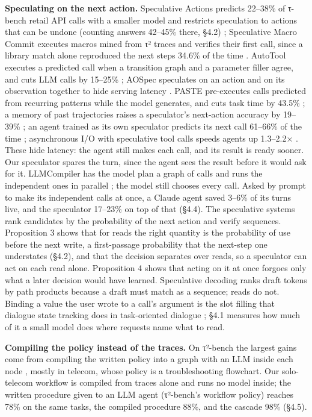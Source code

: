 \documentclass[10pt,twocolumn,letterpaper]{article}
\newcommand{\runin}[1]{{\sffamily\bfseries\color{accent}#1}}
\begin{document}
\runin{Speculating on the next action.} Speculative Actions predicts 22--38\% of τ-bench retail API calls with a smaller model and restricts speculation to actions that can be undone (counting answers 42--45\% there, §4.2) \citep{ye2026speculativeactions}; Speculative Macro Commit executes macros mined from τ² traces and verifies their first call, since a library match alone reproduced the next steps 34.6\% of the time \citep{liu2026macrocommit}. AutoTool executes a predicted call when a transition graph and a parameter filler agree, and cuts LLM calls by 15--25\% \citep{jia2026autotool}; AOSpec speculates on an action and on its observation together to hide serving latency \citep{chen2026aospec}. PASTE pre-executes calls predicted from recurring patterns while the model generates, and cuts task time by 43.5\% \citep{sui2026paste}; a memory of past trajectories raises a speculator's next-action accuracy by 19--39\% \citep{li2026specmemory}; an agent trained as its own speculator predicts its next call 61--66\% of the time \citep{ji2026specreason}; asynchronous I/O with speculative tool calls speeds agents up 1.3--2.2× \citep{hooper2026speculativeinteraction}. These hide latency: the agent still makes each call, and its result is ready sooner. Our speculator spares the turn, since the agent sees the result before it would ask for it. LLMCompiler has the model plan a graph of calls and runs the independent ones in parallel \citep{kim2024llmcompiler}; the model still chooses every call. Asked by prompt to make its independent calls at once, a Claude agent saved 3--6\% of its turns live, and the speculator 17--23\% on top of that (§4.4). The speculative systems rank candidates by the probability of the next action and verify sequences. Proposition 3 shows that for reads the right quantity is the probability of use before the next write, a first-passage probability that the next-step one understates (§4.2), and that the decision separates over reads, so a speculator can act on each read alone. Proposition 4 shows that acting on it at once forgoes only what a later decision would have learned. Speculative decoding \citep{leviathan2023speculative, li2024eagle2, huang2024specdecpp} ranks draft tokens by path products because a draft must match as a sequence; reads do not. Binding a value the user wrote to a call's argument is the slot filling that dialogue state tracking does in task-oriented dialogue \citep{wu2019trade}; §4.1 measures how much of it a small model does where requests name what to read.

\runin{Compiling the policy instead of the traces.} On τ²-bench the largest gains come from compiling the written policy into a graph with an LLM inside each node \citep{luo2026stage, kang2026policyguide}, mostly in telecom, whose policy is a troubleshooting flowchart. Our solo-telecom workflow is compiled from traces alone and runs no model inside; the written procedure given to an LLM agent (τ²-bench's workflow policy) reaches 78\% on the same tasks, the compiled procedure 88\%, and the cascade 98\% (§4.5).
\end{document}
